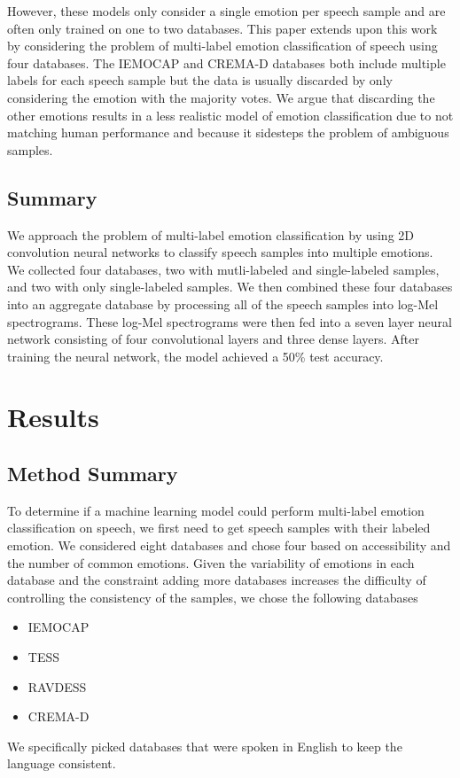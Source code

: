 \documentclass[conference]{IEEEtran}
\begin{document}
However, these models only consider a single emotion per speech sample and are often only trained on one to two databases. This paper extends upon this work by considering the problem of multi-label emotion classification of speech using four databases. The IEMOCAP and CREMA-D databases both include multiple labels for each speech sample but the data is usually discarded by only considering the emotion with the majority votes. We argue that discarding the other emotions results in a less realistic model of emotion classification due to not matching human performance and because it sidesteps the problem of ambiguous samples.

\subsection{Summary}

We approach the problem of multi-label emotion classification by using 2D convolution neural networks to classify speech samples into multiple emotions. We collected four databases, two with mutli-labeled and single-labeled samples, and two with only single-labeled samples. We then combined these four databases into an aggregate database by processing all of the speech samples into log-Mel spectrograms. These log-Mel spectrograms were then fed into a seven layer neural network consisting of four convolutional layers and three dense layers. After training the neural network, the model achieved a 50\% test accuracy.

\section{Results}

\subsection{Method Summary}

To determine if a machine learning model could perform multi-label emotion classification on speech, we first need to get speech samples with their labeled emotion. We considered eight databases and chose four based on accessibility and the number of common emotions. Given the variability of emotions in each database and the constraint adding more databases increases the difficulty of controlling the consistency of the samples, we chose the following databases
\begin{itemize}
	\item IEMOCAP
	\item TESS
	\item RAVDESS
	\item CREMA-D
\end{itemize}
We specifically picked databases that were spoken in English to keep the language consistent.
\end{document}
